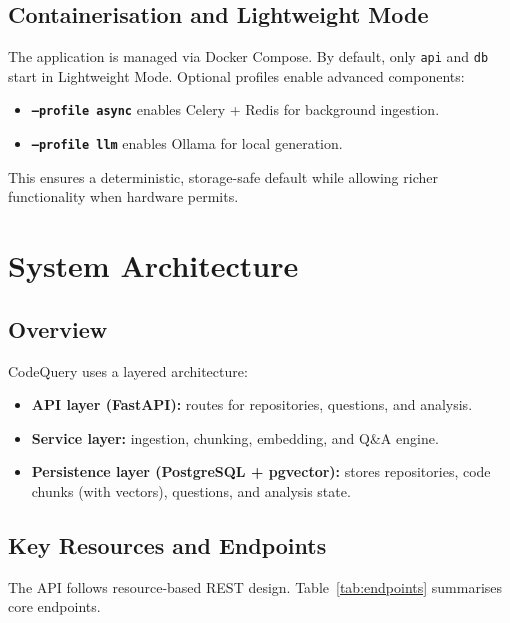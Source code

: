\documentclass[11pt,a4paper]{article}
\begin{document}
\subsection{Containerisation and Lightweight Mode}
The application is managed via Docker Compose. By default, only \texttt{api} and \texttt{db} start in Lightweight Mode. Optional profiles enable advanced components:
\begin{itemize}[leftmargin=1.2em]
  \item \textbf{\texttt{--profile async}} enables Celery + Redis for background ingestion.
  \item \textbf{\texttt{--profile llm}} enables Ollama for local generation.
\end{itemize}
This ensures a deterministic, storage-safe default while allowing richer functionality when hardware permits.

\section{System Architecture}

\subsection{Overview}
CodeQuery uses a layered architecture:
\begin{itemize}[leftmargin=1.2em]
  \item \textbf{API layer (FastAPI):} routes for repositories, questions, and analysis.
  \item \textbf{Service layer:} ingestion, chunking, embedding, and Q\&A engine.
  \item \textbf{Persistence layer (PostgreSQL + pgvector):} stores repositories, code chunks (with vectors), questions, and analysis state.
\end{itemize}

\subsection{Key Resources and Endpoints}
The API follows resource-based REST design. Table~\ref{tab:endpoints} summarises core endpoints.
\end{document}
